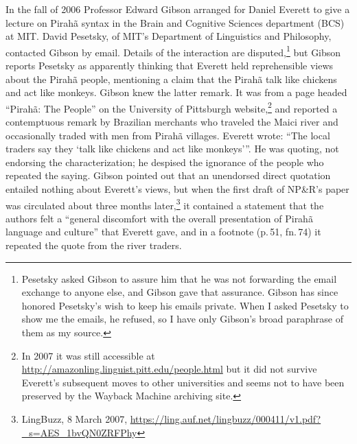 \documentclass[output=paper,colorlinks,citecolor=brown
]{langscibook}
\begin{document}
In the fall of 2006 Professor Edward Gibson arranged for Daniel
Everett to give a lecture on Pirah{\~a} syntax in the Brain and
Cognitive Sciences department (BCS) at MIT. David Pesetsky, of MIT's
Department of Linguistics and Philosophy, contacted Gibson by email.
Details of the interaction are disputed,\footnote{\label{gibson}%
   Pesetsky asked Gibson to assure him that he was not forwarding the
   email exchange to anyone else, and Gibson gave that assurance.
   Gibson has since honored Pesetsky's wish to keep his emails private.
   When I asked Pesetsky to show me the emails, he refused, so I have
   only Gibson's broad paraphrase of them as my source.}
but Gibson reports Pesetsky as apparently thinking that Everett held
reprehensible views about the Pirah{\~a} people, mentioning a claim
that the Pirah{\~a} talk like chickens and act like monkeys.
Gibson knew the latter remark.  It was from a page headed
``Pirah{\~a}: The People'' on the University of Pittsburgh
website,\footnote{\label{pittsburgh}%
  In 2007 it was still accessible at
  \url{http://amazonling.linguist.pitt.edu/people.html} but it did
  not survive Everett's subsequent moves to other universities and
  seems not to have been preserved by the Wayback Machine archiving
  site.}
and reported a contemptuous remark by Brazilian merchants who traveled
the Maici river and occasionally traded with men from Pirah{\~a}
villages. Everett wrote: ``The local traders say they `talk
like chickens and act like monkeys'''. He was quoting, not endorsing
the characterization; he despised the ignorance of the people who
repeated the saying. Gibson pointed out that an unendorsed direct
quotation entailed nothing about Everett's views, but when the first
draft of NP\&R's paper was circulated about three months
later,\footnote{\label{firstrelease}%
   LingBuzz, 8 March 2007,
   \url{https://ling.auf.net/lingbuzz/000411/v1.pdf?_s=AES_1bvQN0ZRFPhy}}
it contained a statement that the authors felt a ``general discomfort
with the overall presentation of Pirahã language and culture'' that
Everett gave, and in a footnote (p.\,51, fn.\,74) it repeated the
quote from the river traders.
\end{document}
